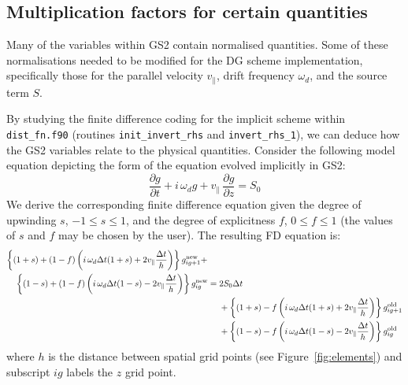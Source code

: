 \documentclass[10pt,a4paper]{article}
\newcommand{\dd}{\partial}
\begin{document}

\subsection{Multiplication factors for certain quantities}
\label{sec:renorm}

Many of the variables within GS2 contain normalised quantities. Some of
these normalisations needed to be modified for the DG scheme implementation,
specifically those for the parallel velocity $v_\parallel$, drift frequency
$\omega_d$, and the source term $S$.

By studying the finite difference coding for the implicit scheme within
\texttt{dist\_fn.f90} (routines \texttt{init\_invert\_rhs} and
\texttt{invert\_rhs\_1}), we can deduce how the GS2 variables relate to the
physical quantities. Consider the following model equation depicting the form
of the equation evolved implicitly in GS2:
\begin{equation}
\frac{\dd g}{\dd t} + i\,\omega_d g + v_\parallel\, \frac{\dd g}{\dd z} = S_0
\label{eqn:gs2advance}
\end{equation}
We derive the corresponding finite difference equation given the degree of
upwinding $s$, $-1 \leq s \leq 1$, and the degree of explicitness $f$, $0 \leq
f \leq 1$ (the values of $s$ and $f$ may be chosen by the user). The resulting
FD equation is:%
\begin{align}
  \left\{ (1+s) + (1-f) \left( i\, \omega_d \Delta t (1+s) + 2v_\parallel \frac{\Delta
        t}{h} \right) \right\} g_{ig+1}^{\mbox{\scriptsize new}} +
  \;\;\;\;\; & \nonumber \\
  \left\{ (1-s) + (1-f) \left( i\, \omega_d \Delta t (1-s) - 2v_\parallel \frac{\Delta
        t}{h} \right) \right\} g_{ig}^{\mbox{\scriptsize new}} = {}& 2
  S_0 \Delta t \nonumber \\
  & + \left\{ (1+s) -f \left( i\,\omega_d \Delta t (1+s) + 2v_\parallel \frac{\Delta
        t}{h} \right) \right\} g_{ig+1}^{\mbox{\scriptsize
      old}} \nonumber \\
  & + \left\{ (1-s) -f \left( i\,\omega_d \Delta t (1-s) - 2v_\parallel \frac{\Delta
        t}{h} \right) \right\} g_{ig}^{\mbox{\scriptsize old}}
\label{eqn:fd1}
\end{align}
where $h$ is the distance between spatial grid points (see
Figure~\ref{fig:elements}) and subscript $ig$ labels the $z$ grid point.
\end{document}
